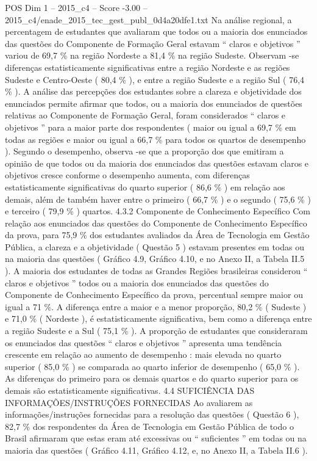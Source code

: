 \begin{textsample}{POS Dim 1 – 2015\_c4 – Score -3.00 – 2015\_c4/enade\_2015\_tec\_gest\_publ\_0d4a20dfe1.txt}
Na análise regional, a percentagem de estudantes que avaliaram que todos ou a maioria dos enunciados das questões do Componente de Formação Geral estavam “ claros e objetivos ” variou de 69,7 \% na região Nordeste a 81,4 \% na região Sudeste.
Observam -se diferenças estatisticamente significativas entre a região Nordeste e as regiões Sudeste e Centro-Oeste ( 80,4 \% ), e entre a região Sudeste e a região Sul ( 76,4 \% ).
A análise das percepções dos estudantes sobre a clareza e objetividade dos enunciados permite afirmar que todos, ou a maioria dos enunciados de questões relativas ao Componente de Formação Geral, foram considerados “ claros e objetivos ” para a maior parte dos respondentes ( maior ou igual a 69,7 \% em todas as regiões e maior ou igual a 66,7 \% para todos os quartos de desempenho ).
Segundo o desempenho, observa -se que a proporção dos que emitiram a opinião de que todos ou da maioria dos enunciados das questões estavam claros e objetivos cresce conforme o desempenho aumenta, com diferenças estatisticamente significativas do quarto superior ( 86,6 \% ) em relação aos demais, além de também haver entre o primeiro ( 66,7 \% ) e o segundo ( 75,6 \% ) e terceiro ( 79,9 \% ) quartos. 4.3.2 Componente de Conhecimento Específico Com relação aos enunciados das questões do Componente de Conhecimento Específico da prova, para 75,9 \% dos estudantes avaliados da Área de Tecnologia em Gestão Pública, a clareza e a objetividade ( Questão 5 ) estavam presentes em todas ou na maioria das questões ( Gráfico 4.9, Gráfico 4.10, e no Anexo II, a Tabela II.5 ).
A maioria dos estudantes de todas as Grandes Regiões brasileiras considerou “ claros e objetivos ” todos ou a maioria dos enunciados das questões do Componente de Conhecimento Específico da prova, percentual sempre maior ou igual a 71 \%.
A diferença entre a maior e a menor proporção, 80,2 \% ( Sudeste ) e 71,0 \% ( Nordeste ), é estatisticamente significativa, bem como a diferença entre a região Sudeste e a Sul ( 75,1 \% ).
A proporção de estudantes que consideraram os enunciados das questões “ claros e objetivos ” apresenta uma tendência crescente em relação ao aumento de desempenho : mais elevada no quarto superior ( 85,0 \% ) se comparada ao quarto inferior de desempenho ( 65,0 \% ).
As diferenças do primeiro para os demais quartos e do quarto superior para os demais são estatisticamente significativas. 4.4 SUFICIÊNCIA DAS INFORMAÇÕES/INSTRUÇÕES FORNECIDAS Ao avaliarem as informações/instruções fornecidas para a resolução das questões ( Questão 6 ), 82,7 \% dos respondentes da Área de Tecnologia em Gestão Pública de todo o Brasil afirmaram que estas eram até excessivas ou “ suficientes ” em todas ou na maioria das questões ( Gráfico 4.11, Gráfico 4.12, e, no Anexo II, a Tabela II.6 ).

\end{textsample}
